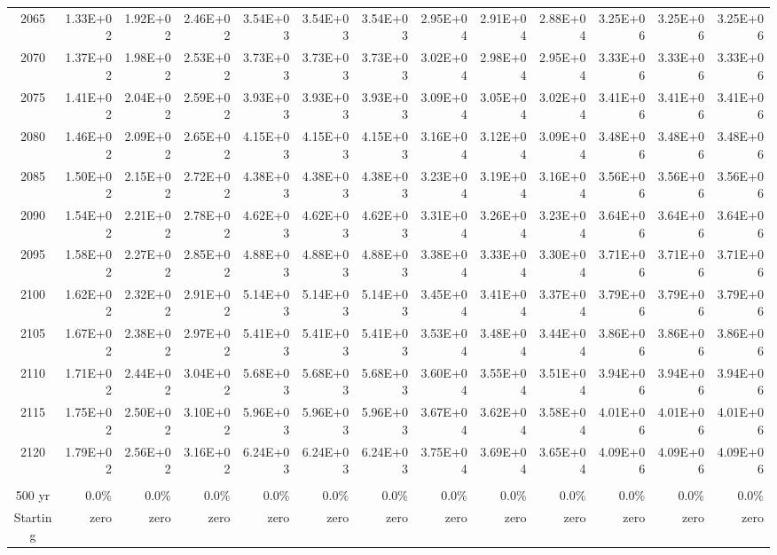 \documentclass{article}
\begin{document}
\begin{table}
\begin{tabular}{crrr|rrr|rrr|rrr}
2065     & 1.33E+02 & 1.92E+02 & 2.46E+02 & 3.54E+03 & 3.54E+03 & 3.54E+03 & 2.95E+04 & 2.91E+04 & 2.88E+04 & 3.25E+06 & 3.25E+06 & 3.25E+06 \\
2070     & 1.37E+02 & 1.98E+02 & 2.53E+02 & 3.73E+03 & 3.73E+03 & 3.73E+03 & 3.02E+04 & 2.98E+04 & 2.95E+04 & 3.33E+06 & 3.33E+06 & 3.33E+06 \\
2075     & 1.41E+02 & 2.04E+02 & 2.59E+02 & 3.93E+03 & 3.93E+03 & 3.93E+03 & 3.09E+04 & 3.05E+04 & 3.02E+04 & 3.41E+06 & 3.41E+06 & 3.41E+06 \\
2080     & 1.46E+02 & 2.09E+02 & 2.65E+02 & 4.15E+03 & 4.15E+03 & 4.15E+03 & 3.16E+04 & 3.12E+04 & 3.09E+04 & 3.48E+06 & 3.48E+06 & 3.48E+06 \\
2085     & 1.50E+02 & 2.15E+02 & 2.72E+02 & 4.38E+03 & 4.38E+03 & 4.38E+03 & 3.23E+04 & 3.19E+04 & 3.16E+04 & 3.56E+06 & 3.56E+06 & 3.56E+06 \\
2090     & 1.54E+02 & 2.21E+02 & 2.78E+02 & 4.62E+03 & 4.62E+03 & 4.62E+03 & 3.31E+04 & 3.26E+04 & 3.23E+04 & 3.64E+06 & 3.64E+06 & 3.64E+06 \\
2095     & 1.58E+02 & 2.27E+02 & 2.85E+02 & 4.88E+03 & 4.88E+03 & 4.88E+03 & 3.38E+04 & 3.33E+04 & 3.30E+04 & 3.71E+06 & 3.71E+06 & 3.71E+06 \\
2100     & 1.62E+02 & 2.32E+02 & 2.91E+02 & 5.14E+03 & 5.14E+03 & 5.14E+03 & 3.45E+04 & 3.41E+04 & 3.37E+04 & 3.79E+06 & 3.79E+06 & 3.79E+06 \\
2105     & 1.67E+02 & 2.38E+02 & 2.97E+02 & 5.41E+03 & 5.41E+03 & 5.41E+03 & 3.53E+04 & 3.48E+04 & 3.44E+04 & 3.86E+06 & 3.86E+06 & 3.86E+06 \\
2110     & 1.71E+02 & 2.44E+02 & 3.04E+02 & 5.68E+03 & 5.68E+03 & 5.68E+03 & 3.60E+04 & 3.55E+04 & 3.51E+04 & 3.94E+06 & 3.94E+06 & 3.94E+06 \\
2115     & 1.75E+02 & 2.50E+02 & 3.10E+02 & 5.96E+03 & 5.96E+03 & 5.96E+03 & 3.67E+04 & 3.62E+04 & 3.58E+04 & 4.01E+06 & 4.01E+06 & 4.01E+06 \\
2120     & 1.79E+02 & 2.56E+02 & 3.16E+02 & 6.24E+03 & 6.24E+03 & 6.24E+03 & 3.75E+04 & 3.69E+04 & 3.65E+04 & 4.09E+06 & 4.09E+06 & 4.09E+06 \\
         &          &          &          &          &          &          &          &          &          &          &          &          \\ \hline
500 yr   & 0.0\%    & 0.0\%    & 0.0\%    & 0.0\%    & 0.0\%    & 0.0\%    & 0.0\%    & 0.0\%    & 0.0\%    & 0.0\%    & 0.0\%    & 0.0\%    \\
Starting & zero     & zero     & zero     & zero     & zero     & zero     & zero     & zero     & zero     & zero     & zero     & zero     \\

\end{tabular}
\end{table}
\end{document}
